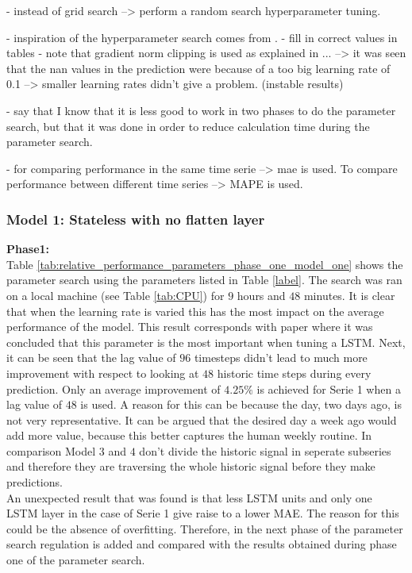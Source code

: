 - instead of grid search --> perform a random search hyperparameter tuning.

- inspiration of the hyperparameter search comes from \cite{Shi2018}.
- fill in correct values in tables
- note that gradient norm clipping is used as explained in ... --> it was seen that the nan values in the prediction were because of a too big learning rate of 0.1 --> smaller learning rates didn't give a problem. (instable results)

- say that I know that it is less good to work in two phases to do the parameter search, but that it was done in order to reduce calculation time during the parameter search. 

- for comparing performance in the same time serie --> mae is used. To compare performance between different time series --> MAPE is used. 


\subsubsection{Model 1: Stateless with no flatten layer}



\textbf{Phase1:}\\
Table \ref{tab:relative_performance_parameters_phase_one_model_one} shows the parameter search using the parameters listed in Table \ref{label}. The search was ran on a local machine (see Table \ref{tab:CPU}) for $ 9 $ hours and $ 48 $ minutes. It is clear that when the learning rate is varied this has the most impact on the average performance of the model. This result corresponds with paper \cite{Greff2017a} where it was concluded that this parameter is the most important when tuning a LSTM. Next, it can be seen that the lag value of $ 96 $ timesteps didn't lead to much more improvement with respect to looking at $ 48 $ historic time steps during every prediction. Only an average improvement of $ 4.25 \% $ is achieved for Serie 1 when a lag value of $ 48 $ is used. A reason for this can be because the day, two days ago, is not very representative. It can be argued that the desired day a week ago would add more value, because this better captures the human weekly routine. In comparison Model $ 3 $ and $ 4 $ don't divide the historic signal in seperate subseries and therefore they are traversing the whole historic signal before they make predictions.\\
An unexpected result that was found is that less LSTM units and only one LSTM layer in the case of Serie 1 give raise to a lower MAE. The reason for this could be the absence of overfitting. Therefore, in the next phase of the parameter search regulation is added and compared with the results obtained during phase one of the parameter search. 


